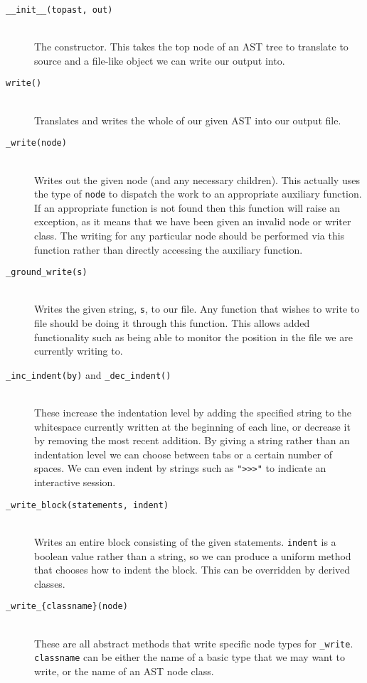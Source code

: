 \documentclass[twoside,a4paper]{report}
\begin{document}
\begin{description}
\item[\texttt{\_\_init\_\_(topast, out)}] \hfill \\
The constructor. This takes the top node of an AST tree to translate to source and a file-like object we can write our output into.

\item[\texttt{write()}] \hfill \\
Translates and writes the whole of our given AST into our output file.

\item[\texttt{\_write(node)}] \hfill \\
Writes out the given node (and any necessary children). This actually uses the type of \texttt{node} to dispatch the work to an appropriate auxiliary function.
If an appropriate function is not found then this function will raise an exception, as it means that we have been given an invalid node or writer class.
The writing for any particular node should be performed via this function rather than directly accessing the auxiliary function.

\item[\texttt{\_ground\_write(s)}] \hfill \\
Writes the given string, \texttt{s}, to our file. Any function that wishes to write to file should be doing it through this function.
This allows added functionality such as being able to monitor the position in the file we are currently writing to.

\item[\texttt{\_inc\_indent(by)} and \texttt{\_dec\_indent()}] \hfill \\
These increase the indentation level by adding the specified string to the whitespace currently written at the beginning of each line, or decrease
it by removing the most recent addition. By giving a string rather than an indentation level we can choose between tabs or a certain number of spaces.
We can even indent by strings such as \texttt{">>>"} to indicate an interactive session.

\item[\texttt{\_write\_block(statements, indent)}] \hfill \\
Writes an entire block consisting of the given statements. \texttt{indent} is a boolean value rather than a string, so we can produce a uniform method
that chooses how to indent the block. This can be overridden by derived classes.

\item[\texttt{\_write\_\{classname\}(node)}] \hfill \\
These are all abstract methods that write specific node types for \texttt{\_write}. \texttt{classname} can be either the name of a basic type that we
may want to write, or the name of an AST node class.

\end{description}
\end{document}
